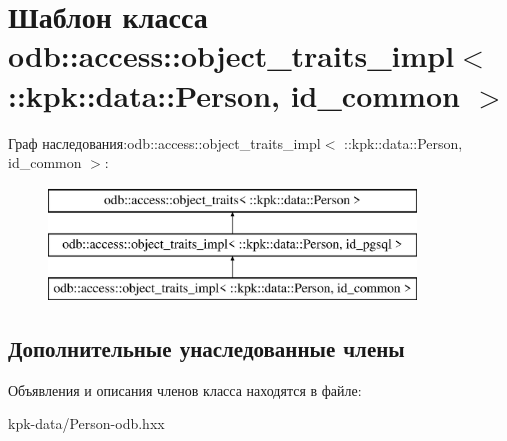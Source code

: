 \hypertarget{classodb_1_1access_1_1object__traits__impl_3_01_1_1kpk_1_1data_1_1_person_00_01id__common_01_4}{}\section{Шаблон класса odb\+:\+:access\+:\+:object\+\_\+traits\+\_\+impl$<$ \+:\+:kpk\+:\+:data\+:\+:Person, id\+\_\+common $>$}
\label{classodb_1_1access_1_1object__traits__impl_3_01_1_1kpk_1_1data_1_1_person_00_01id__common_01_4}
Граф наследования\+:odb\+:\+:access\+:\+:object\+\_\+traits\+\_\+impl$<$ \+:\+:kpk\+:\+:data\+:\+:Person, id\+\_\+common $>$\+:\begin{figure}[H]
\begin{center}
\leavevmode
\includegraphics[height=3.000000cm]{classodb_1_1access_1_1object__traits__impl_3_01_1_1kpk_1_1data_1_1_person_00_01id__common_01_4}
\end{center}
\end{figure}
\subsection*{Дополнительные унаследованные члены}


Объявления и описания членов класса находятся в файле\+:\begin{DoxyCompactItemize}
\item 
kpk-\/data/Person-\/odb.\+hxx\end{DoxyCompactItemize}

